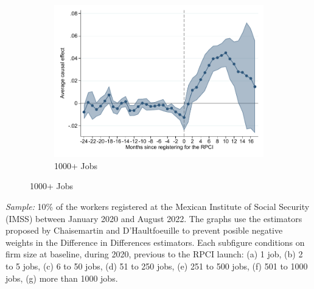 \documentclass[oneside,11pt]{article}
\begin{document}
\begin{figure}[H]
\begin{center}
    \begin{subfigure}{0.49\textwidth}
    \caption{1000+ Jobs}
    \includegraphics[width=\textwidth]{04_Figures/muestra_10porciento/event_study_log_sal_cierre_chaisemartin_firm_size_7.pdf}
    \end{subfigure}
    
    \end{center}
\end{figure}

\scriptsize{
\noindent \textit{Sample:} 10\% of the workers registered at the Mexican Institute of Social Security (IMSS) between January 2020 and August 2022. The graphs use the estimators proposed by Chaisemartin and D'Haultfoeuille to prevent posible negative weights in the Difference in Differences estimators.  Each subfigure conditions on firm size at baseline, during 2020, previous to the RPCI launch: (a) 1 job, (b) 2 to 5 jobs, (c) 6 to 50 jobs, (d) 51 to 250 jobs, (e) 251 to 500 jobs, (f) 501 to 1000 jobs, (g) more than 1000 jobs.
}

\clearpage
\end{document}
